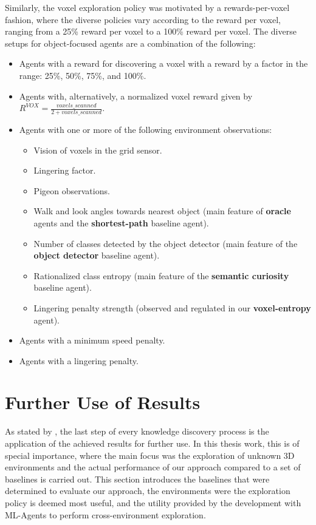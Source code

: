 Similarly, the voxel exploration policy was motivated by a rewards-per-voxel fashion, where the diverse policies vary according to the reward per voxel, ranging from a 25\% reward per voxel to a 100\% reward per voxel. 
The diverse setups for object-focused agents are a combination of the following:
\begin{itemize}
    \item Agents with a reward for discovering a voxel with a reward by a factor in the range: 25\%, 50\%, 75\%, and 100\%.
    \item Agents with, alternatively, a normalized voxel reward given by $ R^{VOX} = \frac{voxels\_scanned}{2 + voxels\_scanned} $.
    \item Agents with one or more of the following environment observations:
    \begin{itemize}
        \item Vision of voxels in the grid sensor.
        \item Lingering factor.
        \item Pigeon observations.
        \item Walk and look angles towards nearest object (main feature of \textbf{oracle} agents and the \textbf{shortest-path} baseline agent).
        \item Number of classes detected by the object detector (main feature of the \textbf{object detector} baseline agent).
        \item Rationalized class entropy (main feature of the \textbf{semantic curiosity} baseline agent).
        \item Lingering penalty strength (observed and regulated in our \textbf{voxel-entropy} agent).
    \end{itemize}
    \item Agents with a minimum speed penalty.
    \item Agents with a lingering penalty.
\end{itemize}


\section{Further Use of Results}\label{chap:3:further-use}
As stated by \textcite{luckert2016using}, the last step of every knowledge discovery process is the application of the achieved results for further use. In this thesis work, this is of special importance, where the main focus was the exploration of unknown 3D environments and the actual performance of our approach compared to a set of baselines is carried out. This section introduces the baselines that were determined to evaluate our approach, the environments were the exploration policy is deemed most useful, and the utility provided by the development with ML-Agents to perform cross-environment exploration.

